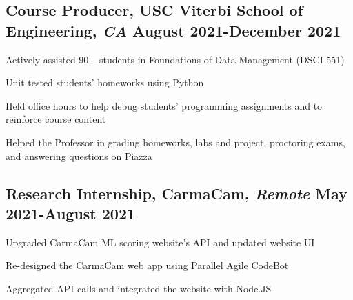 \documentclass[11pt]{article}
\begin{document}
\subsection*{Course Producer{\normalfont, USC Viterbi School of Engineering, 
\textit{CA} \hfill 
August 2021-December 2021}}
\begin{compactitem}
	\item Actively assisted 90+ students in Foundations of Data Management 
	(DSCI 551)
	\item Unit tested students' homeworks using Python
	\item Held office hours to help debug students’ programming assignments 
	and to reinforce 
	course content 
	\item Helped the Professor in grading homeworks, labs and project, 
	proctoring exams, and 
	answering questions on Piazza
\end{compactitem}
\vspace{0.1in}

\subsection*{Research Internship{\normalfont, CarmaCam, \textit{Remote} \hfill May 2021-August 2021}}
\begin{compactitem}
    \item Upgraded CarmaCam ML scoring website's API and updated website UI
    \item Re-designed the CarmaCam web app using Parallel Agile\textregistered\xspace CodeBot\textregistered
    \item Aggregated API calls and integrated the website with Node.JS
\end{compactitem}
\vspace{0.1in}

\end{document}
